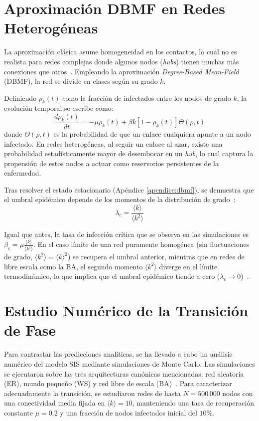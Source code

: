 \documentclass[%
reprint,
amsmath,amssymb,
aps,
]{revtex4-2}
\begin{document}
	\section{Aproximación DBMF en Redes Heterogéneas}
	La aproximación clásica asume homogeneidad en los contactos, lo cual no es realista para redes complejas donde algunos nodos (\textit{hubs}) tienen muchas más conexiones que otros~\cite{Albert2002, PastorSatorras2015}. Empleando la aproximación \textit{Degree-Based Mean-Field} (DBMF), la red se divide en clases según su grado $k$.
	
	Definiendo $\rho_k(t)$ como la fracción de infectados entre los nodos de grado $k$, la evolución temporal se escribe como:
	\begin{equation}\label{ec:din_dbmf_het}
		\frac{d\rho_k(t)}{dt} = -\mu \rho_k(t) + \beta k [1 - \rho_k(t)] \Theta(\rho, t)
	\end{equation}
	donde $\Theta(\rho, t)$ es la probabilidad de que un enlace cualquiera apunte a un nodo infectado. En redes heterogéneas, al seguir un enlace al azar, existe una probabilidad estadísticamente mayor de desembocar en un \textit{hub}, lo cual captura la propensión de estos nodos a actuar como reservorios persistentes de la enfermedad.
	
	Tras resolver el estado estacionario (Apéndice \ref{apendice:dbmf}), se demuestra que el umbral epidémico depende de los momentos de la distribución de grado~\cite{PastorSatorras2015,Roig2026}:
	\begin{equation}
		\lambda_c = \frac{\langle k \rangle}{\langle k^2 \rangle}
		\label{eq:dbmf_threshold}
	\end{equation}
	
	Igual que antes, la tasa de infección crítica que se observa en las simulaciones es $\beta_c  = \mu \frac{\langle k \rangle}{\langle k^2 \rangle}$. En el caso límite de una red puramente homogénea (sin fluctuaciones de grado, $\langle k^2 \rangle = \langle k \rangle^2$) se recupera el umbral anterior, mientras que en redes de libre escala como la BA, el segundo momento $\langle k^2 \rangle$ diverge en el límite termodinámico, lo que implica que el umbral epidémico tiende a cero ($\lambda_c \to 0$)~\cite{PastorSatorras2015,Albert2002}.
	
	\section{Estudio Numérico de la Transición de Fase}
	
	Para contrastar las predicciones analíticas, se ha llevado a cabo un análisis numérico del modelo SIS mediante simulaciones de Monte Carlo. Las simulaciones se ejecutaron sobre las tres arquitecturas canónicas mencionadas: red aleatoria (ER), mundo pequeño (WS) y red libre de escala (BA)~\cite{Albert2002,PastorSatorras2015}. Para caracterizar adecuadamente la transición, se estudiaron redes de hasta $N=500\,000$ nodos con una conectividad media fijada en $\langle k \rangle = 10$, manteniendo una tasa de recuperación constante $\mu = 0.2$ y una fracción de nodos infectados inicial del $10\%$.
	
\end{document}
